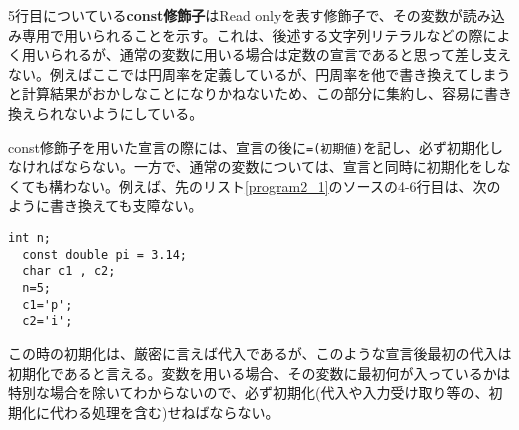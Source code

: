 5行目についている\textbf{const修飾子}はRead onlyを表す修飾子で、その変数が読み込み専用で用いられることを示す。これは、後述する文字列リテラルなどの際によく用いられるが、通常の変数に用いる場合は定数の宣言であると思って差し支えない。例えばここでは円周率を定義しているが、円周率を他で書き換えてしまうと計算結果がおかしなことになりかねないため、この部分に集約し、容易に書き換えられないようにしている。

const修飾子を用いた宣言の際には、宣言の後に\verb|=(初期値)|を記し、必ず初期化しなければならない。一方で、通常の変数については、宣言と同時に初期化をしなくても構わない。例えば、先のリスト\ref{program2_1}のソースの4-6行目は、次のように書き換えても支障ない。
\begin{lstlisting}[firstnumber=4]
  int n;
  const double pi = 3.14;
  char c1 , c2;
  n=5;
  c1='p';
  c2='i';
\end{lstlisting}

この時の初期化は、厳密に言えば代入であるが、このような宣言後最初の代入は初期化であると言える。変数を用いる場合、その変数に最初何が入っているかは特別な場合を除いてわからないので、必ず初期化(代入や入力受け取り等の、初期化に代わる処理を含む)せねばならない。

